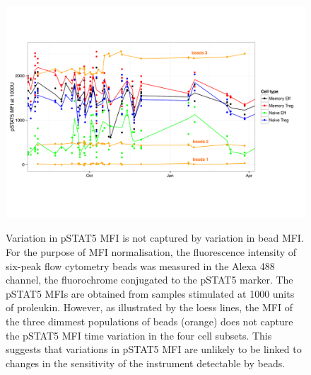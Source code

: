 \begin{figure}
\centering
\begin{minipage}{.8\textwidth}
\includegraphics[width=\linewidth]{figures/pstat5-beads}
\end{minipage}
\begin{minipage}{\textwidth}
{Variation in pSTAT5 MFI is not captured by variation in bead MFI.}
{
  For the purpose of MFI normalisation, the fluorescence intensity of six-peak flow cytometry beads was measured in the Alexa 488 channel, the fluorochrome conjugated to the pSTAT5 marker.
  The pSTAT5 MFIs are obtained from samples stimulated at 1000 units of proleukin.
  However, as illustrated by the loess lines, the MFI of the three dimmest populations of beads (orange) does not capture the pSTAT5 MFI time variation in the four cell subsets.
  This suggests that variations in pSTAT5 MFI are unlikely to be linked to changes in the sensitivity of the instrument detectable by beads.
}
\end{minipage}
\end{figure}


